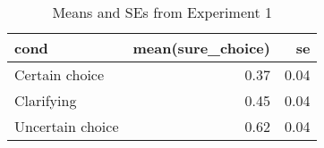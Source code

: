 \begin{table}[ht]
\centering
\caption{Means and SEs from Experiment 1} 
\label{table:means}
\begin{tabular}{lrr}
  \hline
cond & mean(sure\_choice) & se \\ 
  \hline
Certain choice & 0.37 & 0.04 \\ 
  Clarifying & 0.45 & 0.04 \\ 
  Uncertain choice & 0.62 & 0.04 \\ 
   \hline
\end{tabular}
\end{table}
